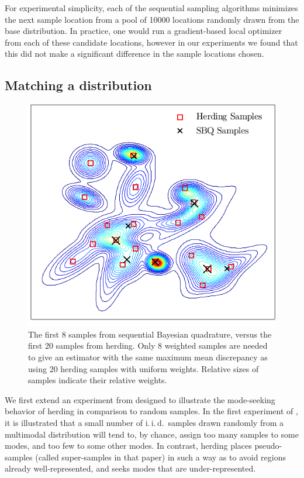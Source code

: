 For experimental simplicity, each of the sequential sampling algorithms minimizes the next sample location from a pool of 10000 locations randomly drawn from the base distribution. In practice, one would run a gradient-based local optimizer from each of these candidate locations, however in our experiments we found that this did not make a significant difference in the sample locations chosen. 

\subsection{Matching a distribution}

\begin{figure}[h]
\centering
\includegraphics[width=.8\columnwidth]{figs/herding/fig1_v2}
\caption[Sequential Bayesian quadrature versus kernel herding]{The first 8 samples from sequential Bayesian quadrature, versus the first 20 samples from herding. Only 8 weighted \sbq{} samples are needed to give an estimator with the same maximum mean discrepancy as using 20 herding samples with uniform weights. Relative sizes of samples indicate their relative weights.\label{fig:fig1}}
\end{figure} 

We first extend an experiment from \citep{Chen2010} designed to illustrate the mode-seeking behavior of herding in comparison to random samples. In the first experiment of \citep{Chen2010}, it is illustrated that a small number of i.\,i.\,d.\ samples drawn randomly from a multimodal distribution will tend to, by chance, assign too many samples to some modes, and too few to some other modes. In contrast, herding places pseudo-samples (called super-samples in that paper) in such a way as to avoid regions already well-represented, and seeks modes that are under-represented.

